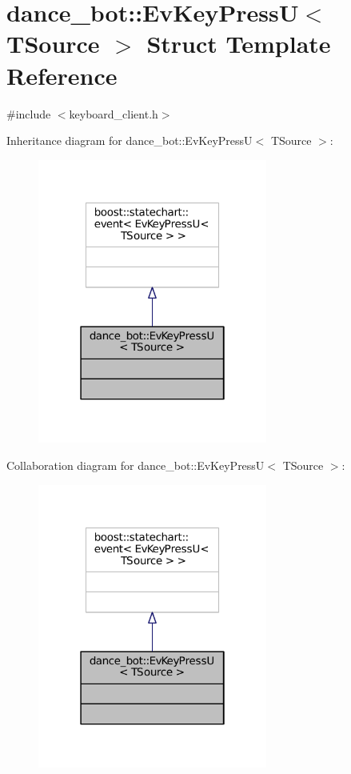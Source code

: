 \hypertarget{structdance__bot_1_1EvKeyPressU}{}\section{dance\+\_\+bot\+:\+:Ev\+Key\+PressU$<$ T\+Source $>$ Struct Template Reference}
\label{structdance__bot_1_1EvKeyPressU}


{\ttfamily \#include $<$keyboard\+\_\+client.\+h$>$}



Inheritance diagram for dance\+\_\+bot\+:\+:Ev\+Key\+PressU$<$ T\+Source $>$\+:
\nopagebreak
\begin{figure}[H]
\begin{center}
\leavevmode
\includegraphics[width=214pt]{structdance__bot_1_1EvKeyPressU__inherit__graph}
\end{center}
\end{figure}


Collaboration diagram for dance\+\_\+bot\+:\+:Ev\+Key\+PressU$<$ T\+Source $>$\+:
\nopagebreak
\begin{figure}[H]
\begin{center}
\leavevmode
\includegraphics[width=214pt]{structdance__bot_1_1EvKeyPressU__coll__graph}
\end{center}
\end{figure}


